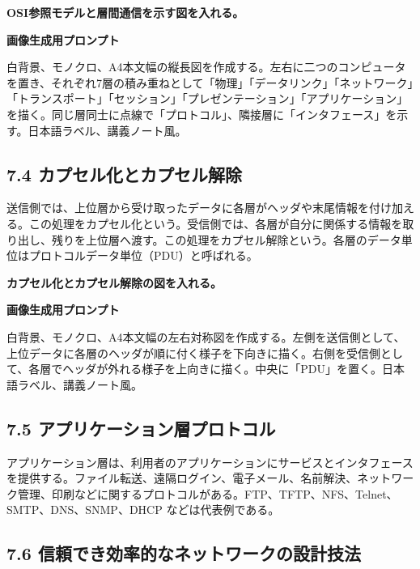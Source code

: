 \documentclass[a4paper,11pt]{ltjsarticle}
\begin{document}
\begin{todobox}
\textbf{OSI参照モデルと層間通信を示す図を入れる。}\par
\textbf{画像生成用プロンプト}\par
白背景、モノクロ、A4本文幅の縦長図を作成する。左右に二つのコンピュータを置き、それぞれ7層の積み重ねとして「物理」「データリンク」「ネットワーク」「トランスポート」「セッション」「プレゼンテーション」「アプリケーション」を描く。同じ層同士に点線で「プロトコル」、隣接層に「インタフェース」を示す。日本語ラベル、講義ノート風。

\end{todobox}

\subsection{7.4 カプセル化とカプセル解除}

送信側では、上位層から受け取ったデータに各層がヘッダや末尾情報を付け加える。この処理をカプセル化という。受信側では、各層が自分に関係する情報を取り出し、残りを上位層へ渡す。この処理をカプセル解除という。各層のデータ単位はプロトコルデータ単位（PDU）と呼ばれる。

\begin{todobox}
\textbf{カプセル化とカプセル解除の図を入れる。}\par
\textbf{画像生成用プロンプト}\par
白背景、モノクロ、A4本文幅の左右対称図を作成する。左側を送信側として、上位データに各層のヘッダが順に付く様子を下向きに描く。右側を受信側として、各層でヘッダが外れる様子を上向きに描く。中央に「PDU」を置く。日本語ラベル、講義ノート風。

\end{todobox}

\subsection{7.5 アプリケーション層プロトコル}

アプリケーション層は、利用者のアプリケーションにサービスとインタフェースを提供する。ファイル転送、遠隔ログイン、電子メール、名前解決、ネットワーク管理、印刷などに関するプロトコルがある。FTP、TFTP、NFS、Telnet、SMTP、DNS、SNMP、DHCP などは代表例である。

\subsection{7.6 信頼でき効率的なネットワークの設計技法}
\end{document}
